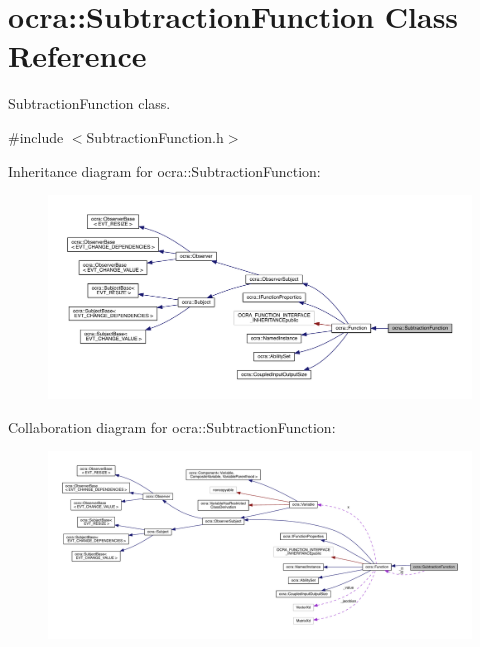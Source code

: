 \hypertarget{classocra_1_1SubtractionFunction}{}\section{ocra\+:\+:Subtraction\+Function Class Reference}
\label{classocra_1_1SubtractionFunction}


Subtraction\+Function class.  




{\ttfamily \#include $<$Subtraction\+Function.\+h$>$}



Inheritance diagram for ocra\+:\+:Subtraction\+Function\+:\nopagebreak
\begin{figure}[H]
\begin{center}
\leavevmode
\includegraphics[width=350pt]{d6/d6b/classocra_1_1SubtractionFunction__inherit__graph}
\end{center}
\end{figure}


Collaboration diagram for ocra\+:\+:Subtraction\+Function\+:\nopagebreak
\begin{figure}[H]
\begin{center}
\leavevmode
\includegraphics[width=350pt]{db/ddf/classocra_1_1SubtractionFunction__coll__graph}
\end{center}
\end{figure}
